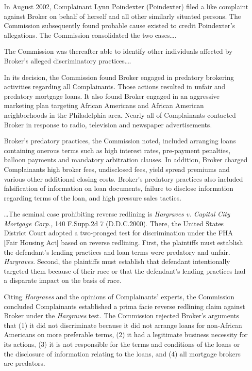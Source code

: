 In August 2002, Complainant Lynn Poindexter (Poindexter) filed a like complaint
against Broker on behalf of herself and all other similarly situated persons.
The Commission subsequently found probable cause existed to credit Poindexter's
allegations. The Commission consolidated the two cases\dots.

The Commission was thereafter able to identify other individuals affected by
Broker's alleged discriminatory practices\dots.


In its decision, the Commission found Broker engaged in predatory brokering
activities regarding all Complainants. Those actions resulted in unfair and
predatory mortgage loans. It also found Broker engaged in an aggressive
marketing plan targeting African Americans and African American neighborhoods
in the Philadelphia area. Nearly all of Complainants contacted Broker in
response to radio, television and newspaper advertisements.

Broker's predatory practices, the Commission noted, included arranging loans
containing onerous terms such as high interest rates, pre-payment penalties,
balloon payments and mandatory arbitration clauses. In addition, Broker charged
Complainants high broker fees, undisclosed fees, yield spread premiums and
various other additional closing costs. Broker's predatory practices also
included falsification of information on loan documents, failure to disclose
information regarding terms of the loan, and high pressure sales tactics.

\dots The seminal case prohibiting reverse redlining is
\textit{Hargraves v. Capital City Mortgage Corp.,}
140 F.Supp.2d 7 (D.D.C.2000). There, the United States District Court adopted
a two-pronged test for discrimination under the FHA [Fair Housing Act] based on
reverse redlining. First, the plaintiffs must establish the defendant's lending
practices and loan terms were predatory and unfair. \textit{Hargraves}. Second,
the plaintiffs must establish that defendant intentionally targeted them
because of their race or that the defendant's lending practices had a disparate
impact on the basis of race. 

Citing \textit{Hargraves} and the opinions of Complainants' experts, the
Commission concluded Complainants established a prima facie reverse redlining
claim against Broker under the \textit{Hargraves} test. The Commission rejected
Broker's arguments that (1) it did not discriminate because it did not arrange
loans for non-African Americans on more preferable terms, (2) it had a
legitimate business necessity for its actions, (3) it is not responsible for
the terms and conditions of the loans or the disclosure of information relating
to the loans, and (4) all mortgage brokers are predators.

